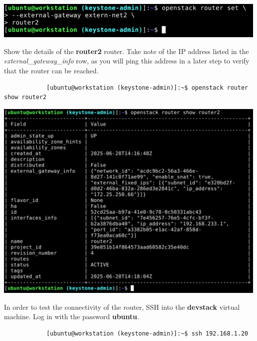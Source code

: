 \documentclass[letterpaper, 12pt]{article}
\begin{document}
\begin{enumerate}
\begin{labstep}
        \begin{center}
            \includegraphics[width=\linewidth]{images/part2/step15.png}
        \end{center}
    \end{labstep}

    \begin{labstep}
        Show the details of the \textbf{router2} router.
        Take note of the IP address listed in the \textit{external\_gateway\_info} row, as you will ping this address in a later step to verify that the router can be reached.
        \begin{lstlisting}
            [ubuntu@workstation (keystone-admin)]:~$ openstack router show router2
        \end{lstlisting}

        \begin{center}
            \includegraphics[scale=0.4]{images/part2/step16.png}
        \end{center}
    \end{labstep}

    \begin{labstep}
        In order to test the connectivity of the router, SSH into the \textbf{devstack} virtual machine.
        Log in with the password \textbf{ubuntu}.
        \begin{lstlisting}
            [ubuntu@workstation (keystone-admin)]:~$ ssh 192.168.1.20
        \end{lstlisting}


\end{labstep}
\end{enumerate}
\end{document}
